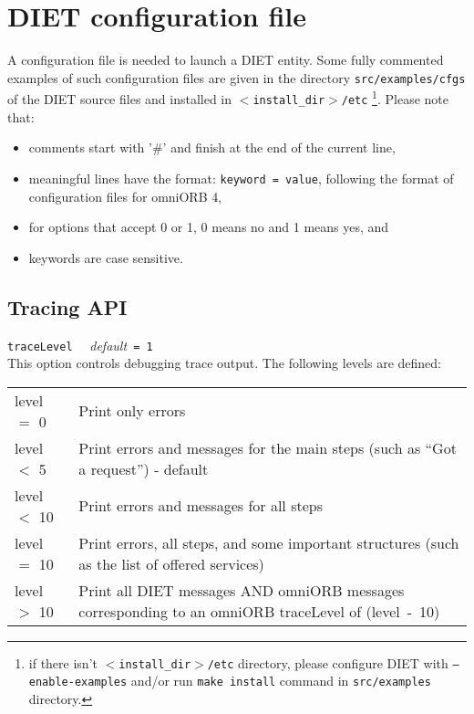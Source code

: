 \section{DIET configuration file}
\label{sec:diet_config_files}

A configuration file is needed to launch a DIET entity. Some fully
commented examples of such configuration files are given in the
directory \texttt{src/examples/cfgs} of the DIET source files and
installed in \texttt{$<$install\_dir$>$/etc} \footnote{if there isn't
\texttt{$<$install\_dir$>$/etc} directory, please configure DIET with
\texttt{--enable-examples} and/or run \texttt{make install} command in
\texttt{src/examples} directory.}. Please note that:
\begin{itemize}
\item comments start with '\#' and finish at the end of the current
  line,
\item meaningful lines have the format: \texttt{keyword = value},
  following the format of configuration files for omniORB 4,
\item for options that accept 0 or 1, 0 means no and 1 means yes, and
\item keywords are case sensitive.
\end{itemize}

\subsection{Tracing API}

\noindent
\texttt{traceLevel} \ \ \emph{default}\texttt{ = 1}\\
This option controls debugging trace output. The following levels are defined:

\begin{center}
 \footnotesize
 \begin{tabular}{p{.1\linewidth}p{.8\linewidth}}
  level $=$ 0  & Print only errors\\
  level $<$ 5  & Print errors and messages for the main steps (such as ``Got a
  request'') - default\\
  level $<$ 10 & Print errors and messages for all steps\\
  level $=$ 10 & Print errors, all steps, and some important structures (such
  as the list of offered services)\\
  level $>$ 10 & Print all DIET messages AND omniORB messages corresponding to
  an omniORB traceLevel of (level~-~10)
 \end{tabular}
\end{center}


